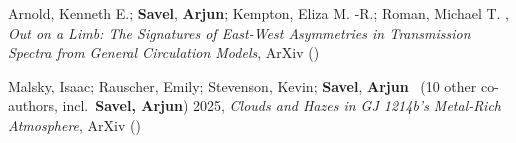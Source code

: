 \item[{\color{numcolor}\scriptsize2}] Arnold, Kenneth E.; \textbf{Savel}, \textbf{Arjun}; Kempton, Eliza M. -R.; Roman, Michael T. , \emph{Out on a Limb: The Signatures of East-West Asymmetries in Transmission Spectra from General Circulation Models}, ArXiv ()

\item[{\color{numcolor}\scriptsize1}] Malsky, Isaac; Rauscher, Emily; Stevenson, Kevin; \textbf{Savel}, \textbf{Arjun} \etal\ ({10} other co-authors, incl.\ \textbf{Savel, Arjun}) 2025, \emph{Clouds and Hazes in GJ 1214b's Metal-Rich Atmosphere}, ArXiv ()